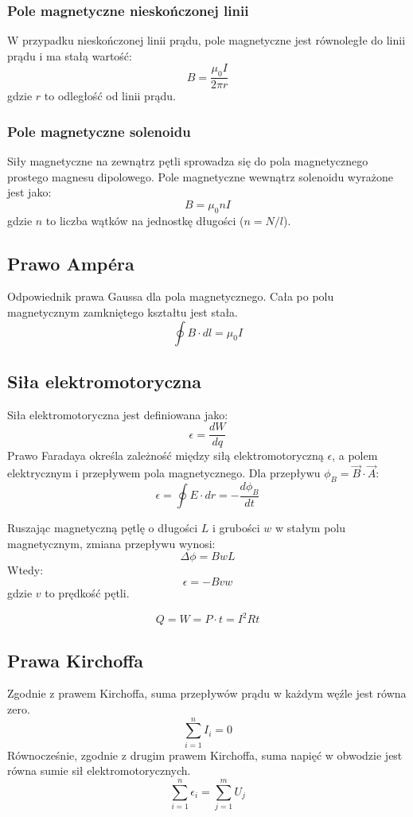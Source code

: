 \documentclass{../notatki}
\begin{document}
\subsubsection{Pole magnetyczne nieskończonej linii}

W przypadku nieskończonej linii prądu, pole magnetyczne jest
równoległe do linii prądu i ma stałą wartość:
$$
B = \frac{\mu_0 I}{2 \pi r}
$$
gdzie $r$ to odległość od linii prądu.

\subsubsection{Pole magnetyczne solenoidu}

Siły magnetyczne na zewnątrz pętli sprowadza się do pola magnetycznego
prostego magnesu dipolowego. Pole magnetyczne wewnątrz solenoidu wyrażone jest
jako:
$$
B = \mu_0 nI
$$
gdzie $n$ to liczba wątków na jednostkę długości ($n = N/l$).

\subsection{Prawo Ampéra}

Odpowiednik prawa Gaussa dla pola magnetycznego. Cała po polu magnetycznym
zamkniętego kształtu jest stała.
$$
\oint B \cdot dl = \mu_0 I
$$

\subsection{Siła elektromotoryczna}

Siła elektromotoryczna jest definiowana jako:
$$
\epsilon = \frac{dW}{dq}
$$
Prawo Faradaya określa zależność między siłą elektromotoryczną
$\epsilon$, a polem elektrycznym i przepływem pola magnetycznego. Dla
przepływu $\phi_B = \vec{B} \cdot \vec{A}$:
$$\epsilon = \oint E \cdot dr = -
\frac{d \phi_B}{dt}$$

Ruszając magnetyczną pętlę o długości $L$ i grubości $w$ w stałym
polu magnetycznym, zmiana przepływu wynosi:
$$
\Delta \phi = BwL
$$
Wtedy:
$$
\epsilon = - Bvw
$$
gdzie $v$ to prędkość pętli.

$$
Q = W = P \cdot t = I^2 Rt
$$

\subsection{Prawa Kirchoffa}

Zgodnie z prawem Kirchoffa, suma przepływów prądu w każdym węźle jest
równa zero.
$$
\sum_{i=1}^{n} I_i = 0
$$
Równocześnie, zgodnie z drugim prawem Kirchoffa, suma napięć w obwodzie
jest równa sumie sił elektromotorycznych.
$$
\sum_{i=1}^{n} \epsilon_i = \sum_{j=1}^{m} U_j
$$
\end{document}
